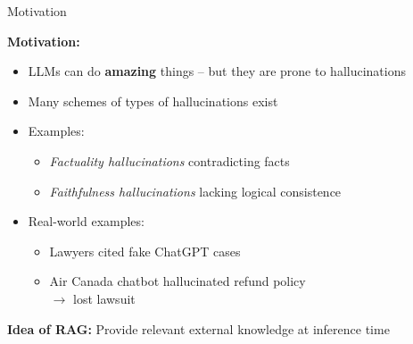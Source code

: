 \documentclass[11pt,compress,t,notes=noshow, xcolor=table]{beamer}
\begin{document}
\begin{frame}{Motivation}

\vfill

\textbf{Motivation:}

\vspace{1em}

\begin{itemize}
    \item LLMs can do \textbf{amazing} things -- but they are prone to hallucinations
    \item Many schemes of types of hallucinations exist 
    \item Examples: 
        \begin{itemize}
            \item \textit{Factuality hallucinations} contradicting facts
            \item \textit{Faithfulness hallucinations} lacking logical consistence
        \end{itemize}
    \item Real-world examples:
        \begin{itemize}
            \item Lawyers cited fake ChatGPT cases 
            \item Air Canada chatbot hallucinated refund policy\\
								  $\rightarrow$ lost lawsuit 
        \end{itemize}
\end{itemize}

\vspace{1em}

\textbf{Idea of RAG:} Provide relevant external knowledge at inference time

\vfill

\end{frame}

\end{document}
